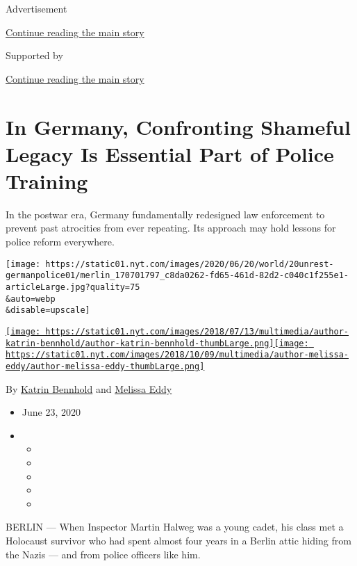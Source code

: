 Advertisement

\protect\hyperlink{after-top}{Continue reading the main story}

Supported by

\protect\hyperlink{after-sponsor}{Continue reading the main story}

\hypertarget{in-germany-confronting-shameful-legacy-is-essential-part-of-police-training}{%
\section{In Germany, Confronting Shameful Legacy Is Essential Part of
Police
Training}\label{in-germany-confronting-shameful-legacy-is-essential-part-of-police-training}}

In the postwar era, Germany fundamentally redesigned law enforcement to
prevent past atrocities from ever repeating. Its approach may hold
lessons for police reform everywhere.

\texttt{[image: https://static01.nyt.com/images/2020/06/20/world/20unrest-germanpolice01/merlin\_170701797\_c8da0262-fd65-461d-82d2-c040c1f255e1-articleLarge.jpg?quality=75\\\&auto=webp\\\&disable=upscale]}

\href{https://www.nytimes.com/by/katrin-bennhold}{\texttt{[image: https://static01.nyt.com/images/2018/07/13/multimedia/author-katrin-bennhold/author-katrin-bennhold-thumbLarge.png]}}\href{https://www.nytimes.com/by/melissa-eddy}{\texttt{[image: https://static01.nyt.com/images/2018/10/09/multimedia/author-melissa-eddy/author-melissa-eddy-thumbLarge.png]}}

By \href{https://www.nytimes.com/by/katrin-bennhold}{Katrin Bennhold}
and \href{https://www.nytimes.com/by/melissa-eddy}{Melissa Eddy}

\begin{itemize}
\item
  June 23, 2020
\item
  \begin{itemize}
  \item
  \item
  \item
  \item
  \item
  \end{itemize}
\end{itemize}

BERLIN --- When Inspector Martin Halweg was a young cadet, his class met
a Holocaust survivor who had spent almost four years in a Berlin attic
hiding from the Nazis --- and from police officers like him.

